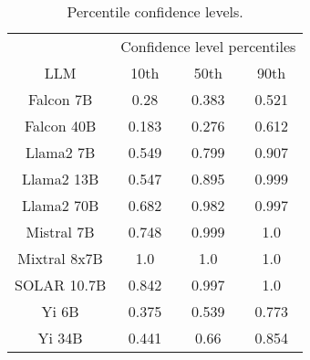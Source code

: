 \begin{table*}
\centering
\begin{tabular}{c|c|c|c}
& \multicolumn{3}{c}{Confidence level percentiles} \\ 
LLM & 10th & 50th & 90th\\ \hline
Falcon 7B & 0.28 & 0.383 & 0.521\\
Falcon 40B & 0.183 & 0.276 & 0.612\\
Llama2 7B & 0.549 & 0.799 & 0.907\\
Llama2 13B & 0.547 & 0.895 & 0.999\\
Llama2 70B & 0.682 & 0.982 & 0.997\\
Mistral 7B & 0.748 & 0.999 & 1.0\\
Mixtral 8x7B & 1.0 & 1.0 & 1.0\\
SOLAR 10.7B & 0.842 & 0.997 & 1.0\\
Yi 6B & 0.375 & 0.539 & 0.773\\
Yi 34B & 0.441 & 0.66 & 0.854\\
\hline
\end{tabular}
\caption{Percentile confidence levels.}
\label{tab:percentile_conf}
\end{table*}
